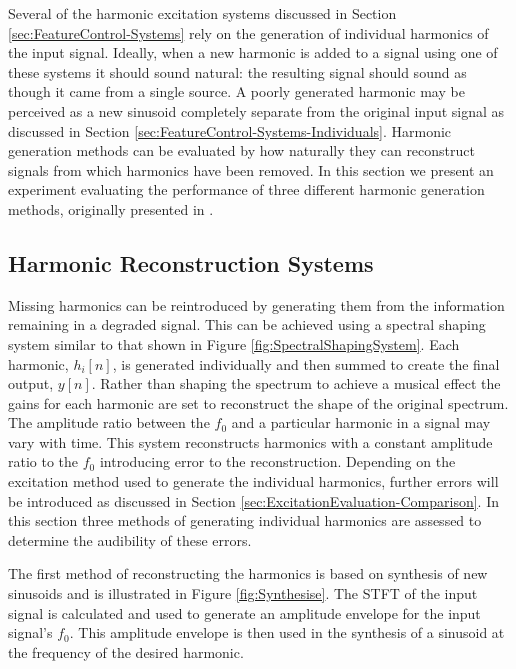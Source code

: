 	Several of the harmonic excitation systems discussed in Section \ref{sec:FeatureControl-Systems} rely on the
	generation of individual harmonics of the input signal.  Ideally, when a new harmonic is added to a signal using
	one of these systems it should sound natural: the resulting signal should sound as though it came from a single
	source. A poorly generated harmonic may be perceived as a new sinusoid completely separate from the original input
	signal as discussed in Section \ref{sec:FeatureControl-Systems-Individuals}.  Harmonic generation methods can be
	evaluated by how naturally they can reconstruct signals from which harmonics have been removed. In this section we
	present an experiment evaluating the performance of three different harmonic generation methods, originally
	presented in \citet{enderby2013methods}.

	\subsection{Harmonic Reconstruction Systems}
	\label{sec:PerceptualExperiments-Reconstruction-Systems}
		Missing harmonics can be reintroduced by generating them from the information remaining in a degraded
		signal. This can be achieved using a spectral shaping system similar to that shown in Figure
		\ref{fig:SpectralShapingSystem}. Each harmonic, $h_{i}[n]$, is generated individually and then summed to
		create the final output, $y[n]$. Rather than shaping the spectrum to achieve a musical effect the gains for
		each harmonic are set to reconstruct the shape of the original spectrum. The amplitude ratio between the
		$f_{0}$ and a particular harmonic in a signal may vary with time. This system reconstructs harmonics with a
		constant amplitude ratio to the $f_{0}$ introducing error to the reconstruction. Depending on the
		excitation method used to generate the individual harmonics, further errors will be introduced as discussed
		in Section \ref{sec:ExcitationEvaluation-Comparison}. In this section three methods of generating
		individual harmonics are assessed to determine the audibility of these errors.

		The first method of reconstructing the harmonics is based on synthesis of new sinusoids and is illustrated
		in Figure \ref{fig:Synthesise}. The STFT of the input signal is calculated and used to generate an
		amplitude envelope for the input signal's $f_{0}$. This amplitude envelope is then used in the synthesis of
		a sinusoid at the frequency of the desired harmonic.

